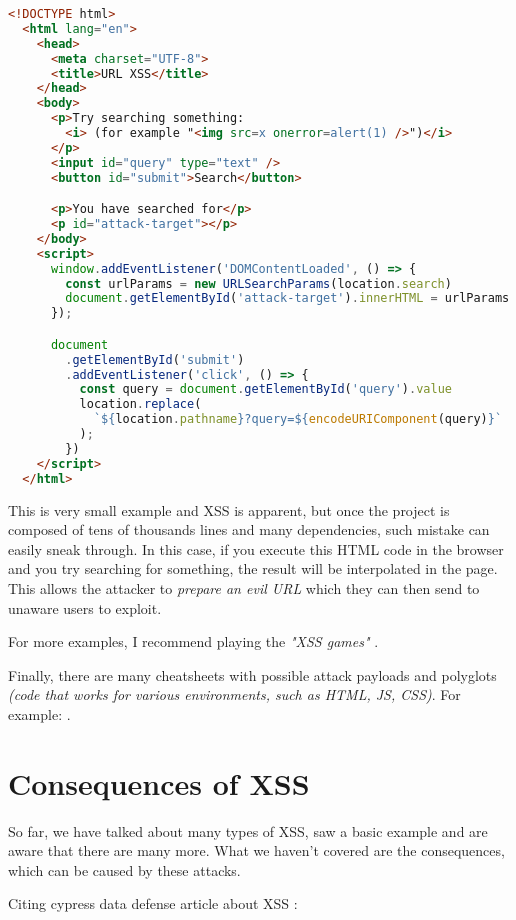 \begin{lstlisting}[language=HTML]
  <!DOCTYPE html>
  <html lang="en">
    <head>
      <meta charset="UTF-8">
      <title>URL XSS</title>
    </head>
    <body>
      <p>Try searching something:
        <i> (for example "<img src=x onerror=alert(1) />")</i>
      </p>
      <input id="query" type="text" />
      <button id="submit">Search</button>

      <p>You have searched for</p>
      <p id="attack-target"></p>
    </body>
    <script>
      window.addEventListener('DOMContentLoaded', () => {
        const urlParams = new URLSearchParams(location.search)
        document.getElementById('attack-target').innerHTML = urlParams.get('query')
      });

      document
        .getElementById('submit')
        .addEventListener('click', () => {
          const query = document.getElementById('query').value
          location.replace(
            `${location.pathname}?query=${encodeURIComponent(query)}`
          );
        })
    </script>
  </html>
\end{lstlisting}

This is very small example and XSS is apparent, but once the project is composed of tens of
thousands lines and many dependencies, such mistake can easily sneak through. In this case, if you
execute this HTML code in the browser and you try searching for something, the result will be
interpolated in the page. This allows the attacker to \emph{prepare an evil URL} which they can then
send to unaware users to exploit.

For more examples, I recommend playing the \emph{"XSS games"} \cite{xss_game_1} \cite{xss_game_2}
\cite{xss_game_3} \cite{xss_game_4}.

Finally, there are many cheatsheets with possible attack payloads and polyglots \emph{(code that
  works for various environments, such as HTML, JS, CSS)}. For example:
\cite{xss_attack_cheatsheet}.

\section{Consequences of XSS}

So far, we have talked about many types of XSS, saw a basic example and are aware that there are
many more. What we haven't covered are the consequences, which can be caused by these attacks.

Citing cypress data defense article about XSS \cite{cypress_xss_consequences}:

